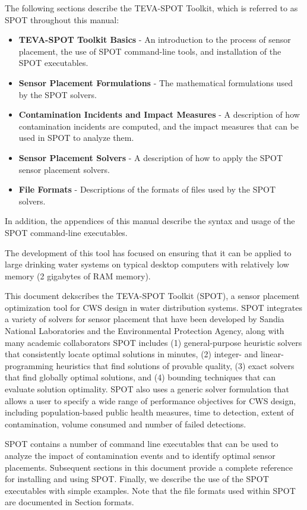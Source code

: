 The following sections describe the TEVA-\/SPOT Toolkit, which is referred to as SPOT throughout this manual: 
\begin{itemize}
\item {\bfseries TEVA-\/SPOT Toolkit Basics} -\/ An introduction to the process of sensor placement, the use of SPOT command-\/line tools, and installation of the SPOT executables. 
\item {\bfseries Sensor Placement Formulations} -\/ The mathematical formulations used by the SPOT solvers. 
\item {\bfseries Contamination Incidents and Impact Measures} -\/ A description of how contamination incidents are computed, and the impact measures that can be used in SPOT to analyze them.


\item {\bfseries Sensor Placement Solvers} -\/ A description of how to apply the SPOT sensor placement solvers. 
\item {\bfseries File Formats} -\/ Descriptions of the formats of files used by the SPOT solvers. 
\end{itemize}In addition, the appendices of this manual describe the syntax and usage of the SPOT command-\/line executables.

 

The development of this tool has focused on
ensuring that it can be applied to large drinking water systems on typical
desktop computers with relatively low memory (2 gigabytes of RAM memory).


This document dekscribes the TEVA-SPOT Toolkit (SPOT), a sensor placement
optimization tool for CWS design in water distribution systems. SPOT
integrates a variety of solvers for sensor placement that have been
developed by Sandia National Laboratories and the Environmental
Protection Agency, along with many academic collaborators\latexonly
\cite{MurUbeJan06,MurBerHar06,CarGreHarKonLauLinMorPhi06,HarBerMurPhiRieWat07,BerHarPhiUbeWat06,BerFleHarPhiWat05}
SPOT includes (1) general-purpose heuristic solvers that consistently
locate optimal solutions in minutes, (2) integer- and linear-programming
heuristics that find solutions of provable quality, (3) exact solvers
that find globally optimal solutions, and (4) bounding techniques that can
evaluate solution optimality. SPOT also uses a generic solver formulation
that allows a user to specify a wide range of performance objectives
for CWS design, including population-based public health measures,
time to detection, extent of contamination, volume consumed and number
of failed detections.

SPOT contains a number of command line executables that can be used to
analyze the impact of contamination events and to identify optimal sensor
placements. Subsequent sections in this document provide a complete
reference for installing and using SPOT. Finally, we describe the use
of the SPOT executables with simple examples.  Note that the file
formats used within SPOT are documented
in Section formats.

\fi
 
